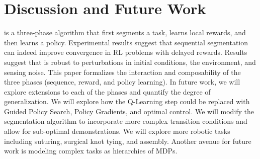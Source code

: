 \section{Discussion and Future Work}
\hirl is a three-phase algorithm that first segments a task, learns local rewards, and then learns a policy.
Experimental results suggest that sequential segmentation can indeed improve convergence in RL problems with delayed rewards.
Results suggest that \hirl is robust to perturbations in initial conditions, the environment, and sensing noise.
This paper formalizes the interaction and composability of the three phases (sequence, reward, and policy learning). In future work, we will explore extensions to each of the phases and quantify the degree of generalization.
We will explore how the Q-Learning step could be replaced with Guided Policy Search, Policy Gradients, and optimal control.
We will modify the segmentation algorithm to incorporate more complex transition conditions and allow for sub-optimal demonstrations.
We will explore more robotic tasks including suturing, surgical knot tying, and assembly.
Another avenue for future work is modeling complex tasks as hierarchies of MDPs.

